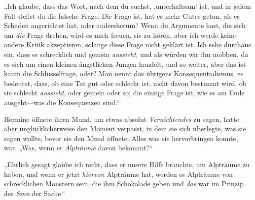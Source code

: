 „Ich glaube, dass das Wort, nach dem du suchst, ‚unterhaltsam‘ ist, und in jedem Fall stellst du die falsche Frage. Die Frage ist, hat es mehr Gutes getan, als es Schaden angerichtet hat, oder andersherum? Wenn du Argumente hast, die sich um \emph{die} Frage drehen, wird es mich freuen, sie zu hören, aber ich werde keine andere Kritik akzeptieren, solange diese Frage nicht geklärt ist. Ich sehe durchaus ein, dass es schrecklich und gemein \emph{aussieht}, und als würden wir ihn mobben, da es sich um einen kleinen ängstlichen Jungen handelt, und so weiter, aber das ist kaum die Schlüsselfrage, oder? Man nennt das übrigens Konsequentialismus, es bedeutet, dass, ob eine Tat gut oder schlecht ist, nicht davon bestimmt wird, ob sie schlecht \emph{aussieht}, oder gemein oder so; die einzige Frage ist, wie es am Ende ausgeht—was die Konsequenzen sind.“

Hermine öffnete ihren Mund, um etwas absolut \emph{Vernichtendes} zu sagen, hatte aber unglücklicherweise den Moment verpasst, in dem sie sich überlegte, was sie sagen wollte, bevor sie den Mund öffnete. Alles was sie hervorbringen konnte, war, „Was, wenn er \emph{Alpträume} davon bekommt?“

„Ehrlich gesagt glaube ich nicht, dass er unsere Hilfe brauchte, um Alpträume zu haben, und wenn er jetzt \emph{hiervon} Alpträume hat, werden es Alpträume von schrecklichen Monstern sein, die ihm Schokolade geben und \emph{das} war im Prinzip der \emph{Sinn} der Sache.“

